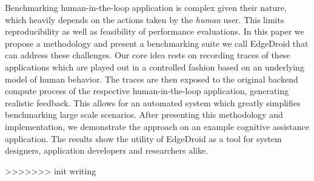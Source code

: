 \documentclass[portrait, a0]{KTHEEposter}
\begin{document}
    \begin{pcolumns}[3]
        \begin{pcolumn}[2]
            \begin{pframe}
                Benchmarking human-in-the-loop application is complex given their nature, which heavily depends on the actions taken by the \emph{human} user.
                This limits reproducibility as well as feasibility of performance evaluations.
                In this paper we propose a methodology and present a benchmarking suite we call EdgeDroid  that can address these challenges.
                Our core idea rests on recording traces of these applications which are played out in a controlled fashion based on an underlying model of human behavior.
                The traces are then exposed to the original backend compute process of the respective human-in-the-loop application, generating realistic feedback.
                This allows for an automated system which greatly simplifies benchmarking large scale scenarios.
                After presenting this methodology and implementation, we demonstrate the approach on an example cognitive assistance application.
                The results show the utility of EdgeDroid as a tool for system designers, application developers and researchers alike.
            \end{pframe}
        \end{pcolumn}
    \end{pcolumns}
>>>>>>> init writing
    
\end{document}
